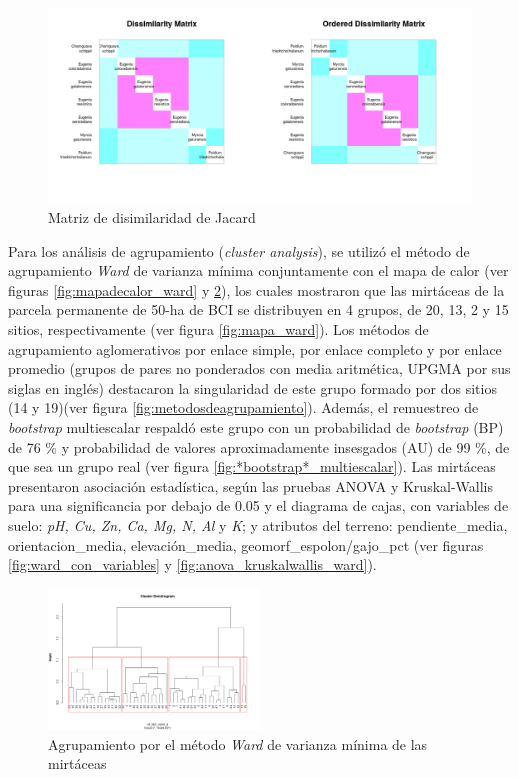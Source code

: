 \documentclass[11pt,]{article}
\begin{document}
\begin{figure}
\centering
\includegraphics{Disimilaridad_.png}
\caption{Matriz de disimilaridad de Jacard \label{fig:matriz_Jacard}}
\end{figure}

Para los análisis de agrupamiento (\emph{cluster analysis}), se utilizó
el método de agrupamiento \emph{Ward} de varianza mínima conjuntamente
con el mapa de calor (ver figuras \ref{fig:mapadecalor_ward} y
\ref{fig:ward_fraccionado}), los cuales mostraron que las mirtáceas de
la parcela permanente de 50-ha de BCI se distribuyen en 4 grupos, de 20,
13, 2 y 15 sitios, respectivamente (ver figura \ref{fig:mapa_ward}). Los
métodos de agrupamiento aglomerativos por enlace simple, por enlace
completo y por enlace promedio (grupos de pares no ponderados con media
aritmética, UPGMA por sus siglas en inglés) destacaron la singularidad
de este grupo formado por dos sitios (14 y 19)(ver figura
\ref{fig:metodosdeagrupamiento}). Además, el remuestreo de
\emph{bootstrap} multiescalar respaldó este grupo con un probabilidad de
\emph{bootstrap} (BP) de 76 \% y probabilidad de valores aproximadamente
insesgados (AU) de 99 \%, de que sea un grupo real (ver figura
\ref {fig:*bootstrap*_multiescalar}). Las mirtáceas presentaron
asociación estadística, según las pruebas ANOVA y Kruskal-Wallis para
una significancia por debajo de 0.05 y el diagrama de cajas, con
variables de suelo: \emph{pH, Cu, Zn, Ca, Mg, N, Al} y \emph{K}; y
atributos del terreno: pendiente\_media, orientacion\_media,
elevación\_media, geomorf\_espolon/gajo\_pct (ver figuras
\ref{fig:ward_con_variables} y \ref{fig:anova_kruskalwallis_ward}).

\begin{figure}
\centering
\includegraphics[width=0.50000\textwidth]{ward_fracionado.png}
\caption{Agrupamiento por el método \emph{Ward} de varianza mínima de
las mirtáceas \label{fig:ward_fraccionado}}
\end{figure}
\end{document}
